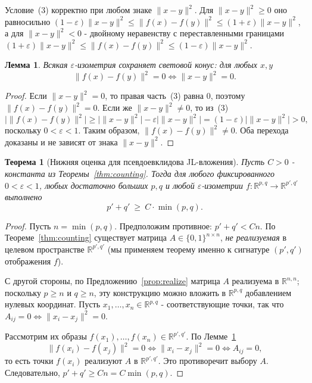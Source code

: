 \documentclass[12pt]{article}
\newtheorem{theorem}{Теорема}
\newtheorem{lemma}{Лемма}
\newcommand{\R}{\mathbb{R}}
\begin{document}
Условие~(3) корректно при любом знаке \(\|x-y\|^2\). Для \(\|x-y\|^2\ge 0\) оно равносильно
\((1-\varepsilon)\|x-y\|^2\le \|f(x)-f(y)\|^2\le (1+\varepsilon)\|x-y\|^2\),
а для \(\|x-y\|^2<0\) - двойному неравенству с переставленными границами
\((1+\varepsilon)\|x-y\|^2\le \|f(x)-f(y)\|^2\le (1-\varepsilon)\|x-y\|^2\).

\begin{lemma}\label{lem:cone}
Всякая \(\varepsilon\)-изометрия сохраняет световой конус: для любых \(x,y\)
\[
\|f(x)-f(y)\|^2 = 0 \iff \|x-y\|^2 = 0 .
\]
\end{lemma}

\begin{proof}
Если \(\|x-y\|^2=0\), то правая часть~(3) равна \(0\), поэтому \(\|f(x)-f(y)\|^2=0\).
Если же \(\|x-y\|^2\ne0\), то из~(3)
\[
\bigl|\|f(x)-f(y)\|^2\bigr| \ge \bigl|\|x-y\|^2\bigr| - \varepsilon\bigl|\|x-y\|^2\bigr| = (1-\varepsilon)\bigl|\|x-y\|^2\bigr| > 0,
\]
поскольку \(0<\varepsilon<1\). Таким образом, \(\|f(x)-f(y)\|^2\ne0\). Оба перехода доказаны и не зависят от знака \(\|x-y\|^2\).
\end{proof}

\begin{theorem}[Нижняя оценка для псевдоевклидова JL-вложения]\label{thm:jl}
Пусть \(C>0\) - константа из Теоремы~\ref{thm:counting}. Тогда для любого фиксированного \(0<\varepsilon<1\), любых достаточно больших \(p,q\) и любой \(\varepsilon\)-изометрии \(f:\R^{p,q}\to\R^{p',q'}\) выполнено
\[
p' + q' \ \ge\ C\cdot \min(p,q).
\]
\end{theorem}

\begin{proof}
Пусть \(n=\min(p,q)\). Предположим противное: \(p'+q' < C n\). По Теореме~\ref{thm:counting} существует матрица \(A\in\{0,1\}^{n\times n}\), \emph{не реализуемая} в целевом пространстве \(\R^{p',q'}\) (мы применяем теорему именно к сигнатуре \((p',q')\) отображения \(f\)).

С другой стороны, по Предложению~\ref{prop:realize} матрица \(A\) реализуема в \(\R^{n,n}\); поскольку \(p\ge n\) и \(q\ge n\), эту конструкцию можно вложить в \(\R^{p,q}\) добавлением нулевых координат. Пусть \(x_1,\dots,x_n\in\R^{p,q}\) - соответствующие точки, так что \(A_{ij}=0\iff\|x_i-x_j\|^2=0\).

Рассмотрим их образы \(f(x_1),\dots,f(x_n)\in\R^{p',q'}\). По Лемме~\ref{lem:cone}
\[
\|f(x_i)-f(x_j)\|^2 = 0 \iff \|x_i-x_j\|^2 = 0 \iff A_{ij}=0,
\]
то есть точки \(f(x_i)\) реализуют \(A\) в \(\R^{p',q'}\). Это противоречит выбору \(A\). Следовательно, \(p'+q'\ge C n = C\min(p,q)\).
\end{proof}
\end{document}
